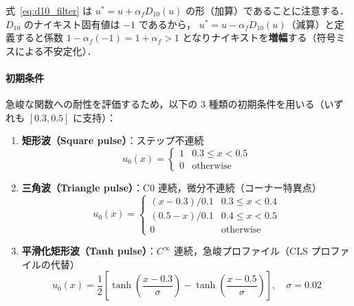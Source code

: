\begin{tcolorbox}[warnbox, title={フィルタ符号の注意}]
式~\eqref{eq:d10_filter} は $u^* = u + \alpha_f D_{10}(u)$ の形（加算）であることに注意する．
$D_{10}$ のナイキスト固有値は $-1$ であるから，
$u^* = u - \alpha_f D_{10}(u)$（減算）と定義すると係数 $1 - \alpha_f (-1) = 1+\alpha_f > 1$
となりナイキストを\textbf{増幅}する（符号ミスによる不安定化）．
\end{tcolorbox}

\paragraph{初期条件}
急峻な関数への耐性を評価するため，以下の 3 種類の初期条件を用いる（いずれも $[0.3, 0.5]$ に支持）：

\begin{enumerate}
  \item \textbf{矩形波（Square pulse）}：ステップ不連続
    \begin{equation}
      u_0(x) = \begin{cases} 1 & 0.3 \le x < 0.5 \\ 0 & \text{otherwise} \end{cases}
      \label{eq:ic_square}
    \end{equation}

  \item \textbf{三角波（Triangle pulse）}：C0 連続，微分不連続（コーナー特異点）
    \begin{equation}
      u_0(x) = \begin{cases}
        (x - 0.3)/0.1 & 0.3 \le x < 0.4 \\
        (0.5 - x)/0.1 & 0.4 \le x < 0.5 \\
        0              & \text{otherwise}
      \end{cases}
      \label{eq:ic_triangle}
    \end{equation}

  \item \textbf{平滑化矩形波（Tanh pulse）}：$C^\infty$ 連続，急峻プロファイル（CLS プロファイルの代替）
    \begin{equation}
      u_0(x) = \frac{1}{2}\left[
        \tanh\!\left(\frac{x - 0.3}{\sigma}\right)
        - \tanh\!\left(\frac{x - 0.5}{\sigma}\right)
      \right], \quad \sigma = 0.02
      \label{eq:ic_tanh}
    \end{equation}
\end{enumerate}

